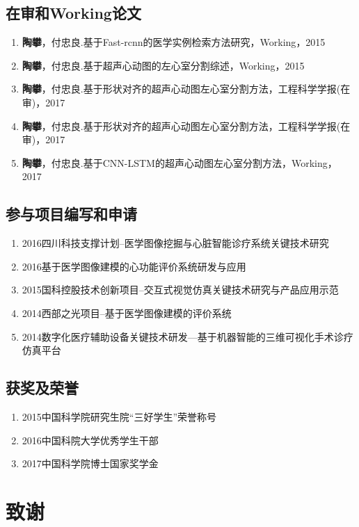 \section*{在审和Working论文}
\begin{enumerate}
\item{\textbf{陶攀}，付忠良.{基于Fast-rcnn的医学实例检索方法研究}，{Working}，2015}
\item{\textbf{陶攀}，付忠良.{基于超声心动图的左心室分割综述}，{Working}，2015}
\item{\textbf{陶攀}，付忠良.{基于形状对齐的超声心动图左心室分割方法}，{工程科学学报(在审)}，2017}
\item{\textbf{陶攀}，付忠良.{基于形状对齐的超声心动图左心室分割方法}，{工程科学学报(在审)}，2017}
\item{\textbf{陶攀}，付忠良.{基于CNN-LSTM的超声心动图左心室分割方法}，{Working}，2017}

\end{enumerate}


\section*{参与项目编写和申请}
\begin{enumerate}
\item{2016}{四川科技支撑计划--医学图像挖掘与心脏智能诊疗系统关键技术研究 }{}
\item{2016}{基于医学图像建模的心功能评价系统研发与应用}{}
\item{2015}{国科控股技术创新项目--交互式视觉仿真关键技术研究与产品应用示范}{}
\item{ 2014}{西部之光项目--基于医学图像建模的评价系统 }{}
\item{2014}{数字化医疗辅助设备关键技术研发—基于机器智能的三维可视化手术诊疗仿真平台}{}
\end{enumerate}
\section*{获奖及荣誉}
\begin{enumerate}
\item{2015}{中国科学院研究生院“三好学生”荣誉称号}
\item{2016}{中国科院大学优秀学生干部}
\item{2017}{中国科学院博士国家奖学金}
\end{enumerate}

\chapter{致\quad 谢}


